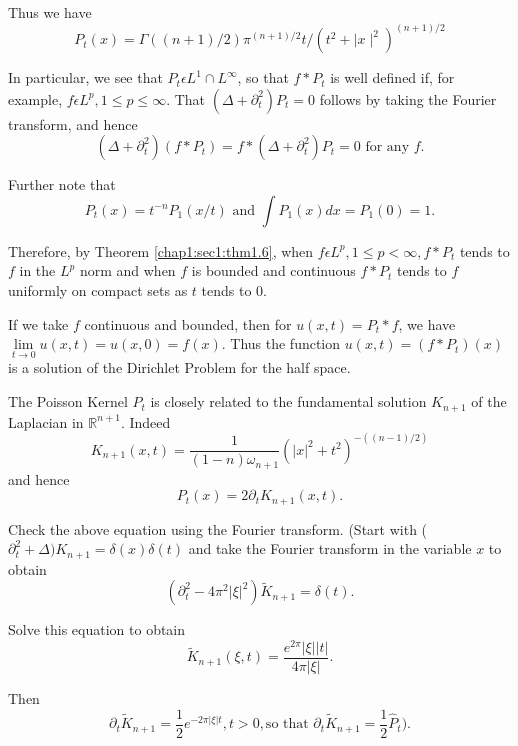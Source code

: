 Thus we have
\begin{equation*}
  P_t(x) = \Gamma ((n + 1)/2)\pi^{(n+1)/2} t/(t^2+\mid x
  \mid^2)^{(n+1)/2} \tag{2.31}\label{chap2:sec4:eq2.31} 
\end{equation*}

In particular, we see that $P_t\epsilon L^1 \cap L^\infty$, so that
$f*P_t$ is well defined if, for example, $f \epsilon L^p, 1\le p
\le \infty$. That $(\Delta + \partial^2_t)P_t=0$ follows by taking the
Fourier transform, and hence  
$$
(\Delta + \partial^2_t)(f*P_t)= f *(\Delta + \partial^2_t) P_t=0
\text{ for any } f. 
$$

Further note that 
$$
P_t(x)= t^{-n} P_1(x/t) \text{ and } \int P_1 (x) dx = \hat{P}_1 (0)=1.
$$

Therefore, by Theorem \ref{chap1:sec1:thm1.6}, when $f \epsilon L^p, 1\le p <
\infty, f * P_t$ tends to $f$ in the $L^p$ norm  and when $f$ is
bounded and continuous $ f * P_t$ tends to $f$ uniformly on compact
sets as $t$ tends to 0.  
 
If we take $f$ continuous and bounded, then for $u(x,t)= P_t * f$, we
have $\lim\limits_{t \to 0} u(x,t) = u(x,0)= f(x)$. Thus the function
$u(x,t) = (f * P_t)(x)$\pageoriginale is a solution of the Dirichlet Problem for
the half space. 

\setcounter{rem}{31}
\begin{rem}\label{chap2:sec4:thm2.32} %
  The Poisson Kernel $P_t$ is closely related to the fundamental
  solution $K_{n+1}$ of the Laplacian in $\mathbb{R}^{n+1}$. Indeed  
  $$
  K_{n+1} (x,t) = \frac{1}{(1 - n) \omega_{n+1}}(|x|^2 + t^2)^{-((n-1)/2)}
  $$ 
  and hence
  $$
  P_t(x) = 2 \partial_t K_{n+1}(x,t).
  $$
\end{rem}

\begin{exercise}%
  Check the above equation using the Fourier transform. (Start with
  ($\partial^2_t +\Delta) K_{n+1} = \delta(x)\delta(t)$ and take the
  Fourier transform in the variable $x$ to obtain 
  $$
  (\partial^2_t - 4\pi^2 |\xi|^2) \tilde{K}_{n+1} = \delta(t).
  $$
  
  Solve this equation to obtain
  $$
  \tilde{K}_{n+1}(\xi, t) = \frac{e^{2 \pi}|\xi||t|}{4 \pi |\xi|}.
  $$
  
  Then 
  $$
  \partial_t \tilde{K}_{n+1} = \frac{1}{2} e^{-2\pi |\xi|t}, t > 0
  ,\text {so  that }  \partial_t \tilde{K}_{n+1} = \frac{1}{2} \hat{P}_t).
  $$
\end{exercise}

